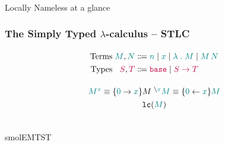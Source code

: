 \begin{frame}
  \vfill
  \centering
  \begin{sticky}
     \\
    {\normalfont\Large Locally Nameless at a glance} \par%
  \end{sticky}
  \vfill
\end{frame}

\begin{frame}
  \frametitle{The Simply Typed $\lambda$-calculus -- STLC}

\begin{displaymath}
  \arraycolsep=1.4pt\def\arraystretch{1.3}
  \begin{array}{rrcl}
    \text{Terms} & \dexp M, \dexp N & \bnfas & \bvar n \bnfalt \fvar x \bnfalt \lam M \bnfalt \app M N\\
    \text{Types} & \dte S, \dte T & \bnfas & \base \bnfalt \arr S T\\
  \end{array}
\end{displaymath}


\begin{displaymath}
  \arraycolsep=1.4pt\def\arraystretch{1.3}
  \begin{array}{cc}
    \openop {\dexp M} {\vex x} \equiv \{\vex 0 \rightarrow \vex x\} M & \closeop {\dexp M} {\vex x} \equiv \{\vex 0 \leftarrow \vex x\} \dexp M \\
    \multicolumn{2}{c}{\lclosed {\dexp M}}\\
  \end{array}
\end{displaymath}


\end{frame}

\begin{frame}
  \vfill
  \centering
  \begin{sticky}
     \\
    {\normalfont\Large smolEMTST} \par%
  \end{sticky}
  \vfill
\end{frame}


